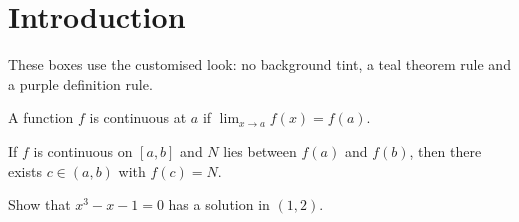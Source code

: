 \documentclass{didactic}
\begin{document}
\maketitle

\section{Introduction}
These boxes use the customised look: no background tint, a teal theorem rule and
a purple definition rule.

\begin{definition}[Continuity]
	A function $f$ is continuous at $a$ if $\lim_{x \to a} f(x) = f(a)$.
\end{definition}

\begin{theorem}
	If $f$ is continuous on $[a,b]$ and $N$ lies between $f(a)$ and $f(b)$,
	then there exists $c \in (a,b)$ with $f(c) = N$.
\end{theorem}

\begin{exercise}
	Show that $x^3 - x - 1 = 0$ has a solution in $(1, 2)$.
\end{exercise}
\end{document}
